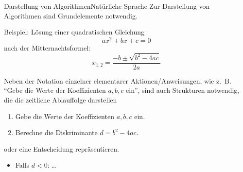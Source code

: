 \documentclass[xelatex,aspectratio=169]{beamer}
\begin{document}
\begin{frame}{Darstellung von Algorithmen}{Natürliche Sprache}
  Zur Darstellung von Algorithmen sind Grundelemente notwendig.
  \begin{exampleblock}{Beispiel: Lösung einer quadratischen Gleichung}
    \[ a x^2 + b x + c = 0 \]
    nach der Mitternachtsformel:
    \[ x_{1,2} = \frac{-b \pm \sqrt{b^2 - 4ac}}{2a} \]
  \end{exampleblock}

  Neben der Notation einzelner elementarer Aktionen/Anweisungen, wie z.~B. \enquote{Gebe die Werte der Koeffizienten $a, b, c$ ein}, sind auch Strukturen notwendig, die die zeitliche Ablauffolge darstellen
  \begin{enumerate}
    \item Gebe die Werte der Koeffizienten $a, b, c$ ein.
    \item Berechne die Diskriminante $d = b^2 - 4ac$.
  \end{enumerate}
  oder eine Entscheidung repräsentieren.
  \begin{itemize}
    \item Falls $d < 0$: \ldots
  \end{itemize}
\end{frame}
\end{document}
